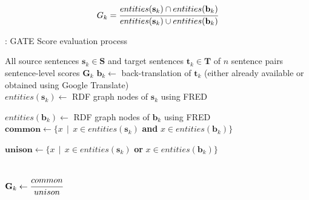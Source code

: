 \documentclass[runningheads]{llncs}
\begin{document}
\[{G}_{k} = \cfrac{entities(\mathbf{s}_k)\cap entities(\mathbf{b}_k)}{entities(\mathbf{s}_k)\cup entities(\mathbf{b}_k)}\]











\begin{algorithm}
  \caption{: GATE Score evaluation process}
  \begin{algorithmic}[1]
  \Require All source sentences $\mathbf{s}_k \in \mathbf{S}$ and target sentences $\mathbf{t}_k \in \mathbf{T}$ of $n$ sentence pairs
  \Ensure sentence-level scores $\mathbf{G}_k$
      \State $\mathbf{b}_k \gets$ back-translation of $\mathbf{t}_k$ (either already available or obtained using Google Translate)
      \\
      \State $entities(\mathbf{s}_k) \gets$ RDF graph nodes of
      $\mathbf{s}_k$ 
      using FRED 
      
      \State $entities(\mathbf{b}_k) \gets$ RDF graph nodes of 
      $\mathbf{b}_k$ 
      using FRED 
\\

\State $\mathbf{common} \gets \{x\,\mid\, x \in entities(\mathbf{s}_k)$  \textbf{and}  $x \in entities(\mathbf{b}_k)\}$

\State $\mathbf{unison} \gets \{x\,\mid\, x \in entities(\mathbf{s}_k)$  \textbf{or}  $x \in entities(\mathbf{b}_k)\}$

\\
\State $\mathbf{G}_{k} \gets \cfrac{common}{unison}$ 
  \\
  \EndFor
  \end{algorithmic}
  \label{algo}
\end{algorithm}
\end{document}
